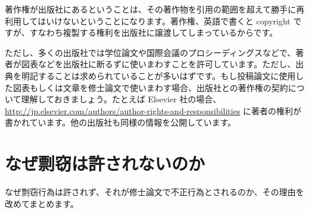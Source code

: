 著作権が出版社にあるということは、その著作物を引用の範囲を超えて勝手に再利用してはいけないということになります。著作権、英語で書くと copyright ですが、すなわち複製する権利を出版社に譲渡してしまっているからです。

ただし、多くの出版社では学位論文や国際会議のプロシーディングスなどで、著者が図表などを出版社に断るずに使いまわすことを許可しています。ただし、出典を明記することは求められていることが多いはずです。もし投稿論文に使用した図表もしくは文章を修士論文で使いまわす場合、出版社との著作権の契約について理解しておきましょう。たとえば Elsevier 社の場合、\url{http://jp.elsevier.com/authors/author-rights-and-responsibilities} に著者の権利が書かれています。他の出版社も同様の情報を公開しています。

\section{なぜ剽窃は許されないのか}

なぜ剽窃行為は許されず、それが修士論文で不正行為とされるのか、その理由を改めてまとめます。

